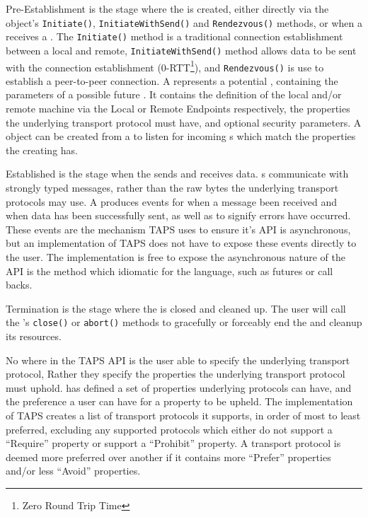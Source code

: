 Pre-Establishment is the stage where the \connection{} is created, either directly via the \preconnection{} object's
\texttt{Initiate()}, \texttt{InitiateWithSend()} and \texttt{Rendezvous()} methods, or when a \listener{} receives a
\connection{}.
The \texttt{Initiate()} method is a traditional connection establishment between a local and remote,
\texttt{InitiateWithSend()} method allows data to be sent with the connection establishment
(0-RTT\footnote{Zero Round Trip Time}), and \texttt{Rendezvous()} is use to establish a peer-to-peer connection.
A \preconnection{} represents a potential \connection{}, containing the parameters of a possible future \connection{}.
It contains the definition of the local and/or remote machine via the Local or Remote Endpoints respectively, the
properties the underlying transport protocol must have, and optional security parameters.
A \listener{} object can be created from a \preconnection{} to listen for incoming \connection{}s which match the
properties the creating \preconnection{} has.

Established is the stage when the \connection{} sends and receives data.
\connection{}s communicate with strongly typed messages, rather than the raw bytes the underlying transport protocols
may use.
A \connection{} produces events for when a message been received and when data has been successfully sent, as well as
to signify errors have occurred.
These events are the mechanism TAPS uses to ensure it's API is asynchronous, but an implementation of TAPS does not have
to expose these events directly to the user.
The implementation is free to expose the asynchronous nature of the API is the method which idiomatic for the language,
such as futures or call backs.

Termination is the stage where the \connection{} is closed and cleaned up.
The user will call the \connection{}'s \texttt{close()} or \texttt{abort()} methods to gracefully or forceably end
the \connection{} and cleanup its resources.

No where in the TAPS API is the user able to specify the underlying transport protocol, Rather they specify the
properties the underlying transport protocol must uphold.
\citet[§~5.2]{trammell_abstractapplicationlayer_2020} has defined a set of properties underlying protocols can have,
and the preference a user can have for a property to be upheld.
The implementation of TAPS creates a list of transport protocols it supports, in order of most to least preferred,
excluding any supported protocols which either do not support a “Require” property or support a “Prohibit” property.
A transport protocol is deemed more preferred over another if it contains more “Prefer” properties and/or less “Avoid”
properties.

